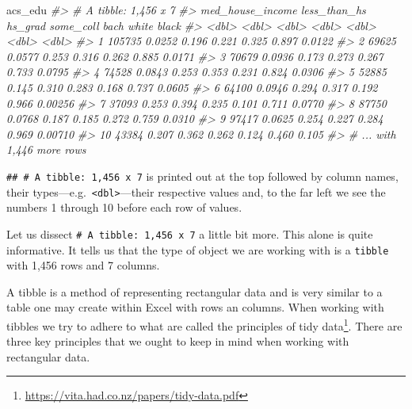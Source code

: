 \documentclass[
]{book}
\newenvironment{Shaded}{\begin{snugshade}}{\end{snugshade}}
\newcommand{\CommentTok}[1]{\textcolor[rgb]{0.56,0.35,0.01}{\textit{#1}}}
\newcommand{\NormalTok}[1]{#1}
\begin{document}
\begin{Shaded}
\begin{Highlighting}[]
\NormalTok{acs\_edu}
\CommentTok{\#\textgreater{} \# A tibble: 1,456 x 7}
\CommentTok{\#\textgreater{}    med\_house\_income less\_than\_hs hs\_grad some\_coll  bach white   black}
\CommentTok{\#\textgreater{}               \textless{}dbl\textgreater{}        \textless{}dbl\textgreater{}   \textless{}dbl\textgreater{}     \textless{}dbl\textgreater{} \textless{}dbl\textgreater{} \textless{}dbl\textgreater{}   \textless{}dbl\textgreater{}}
\CommentTok{\#\textgreater{}  1           105735       0.0252   0.196     0.221 0.325 0.897 0.0122 }
\CommentTok{\#\textgreater{}  2            69625       0.0577   0.253     0.316 0.262 0.885 0.0171 }
\CommentTok{\#\textgreater{}  3            70679       0.0936   0.173     0.273 0.267 0.733 0.0795 }
\CommentTok{\#\textgreater{}  4            74528       0.0843   0.253     0.353 0.231 0.824 0.0306 }
\CommentTok{\#\textgreater{}  5            52885       0.145    0.310     0.283 0.168 0.737 0.0605 }
\CommentTok{\#\textgreater{}  6            64100       0.0946   0.294     0.317 0.192 0.966 0.00256}
\CommentTok{\#\textgreater{}  7            37093       0.253    0.394     0.235 0.101 0.711 0.0770 }
\CommentTok{\#\textgreater{}  8            87750       0.0768   0.187     0.185 0.272 0.759 0.0310 }
\CommentTok{\#\textgreater{}  9            97417       0.0625   0.254     0.227 0.284 0.969 0.00710}
\CommentTok{\#\textgreater{} 10            43384       0.207    0.362     0.262 0.124 0.460 0.105  }
\CommentTok{\#\textgreater{} \# ... with 1,446 more rows}
\end{Highlighting}
\end{Shaded}

\texttt{\#\#\ \#\ A\ tibble:\ 1,456\ x\ 7} is printed out at the top followed by column names, their types---e.g.~\texttt{\textless{}dbl\textgreater{}}---their respective values and, to the far left we see the numbers 1 through 10 before each row of values.

Let us dissect \texttt{\#\ A\ tibble:\ 1,456\ x\ 7} a little bit more. This alone is quite informative. It tells us that the type of object we are working with is a \texttt{tibble} with 1,456 rows and 7 columns.

A tibble is a method of representing rectangular data and is very similar to a table one may create within Excel with rows an columns. When working with tibbles we try to adhere to what are called the principles of tidy data\footnote{\url{https://vita.had.co.nz/papers/tidy-data.pdf}}. There are three key principles that we ought to keep in mind when working with rectangular data.
\end{document}

